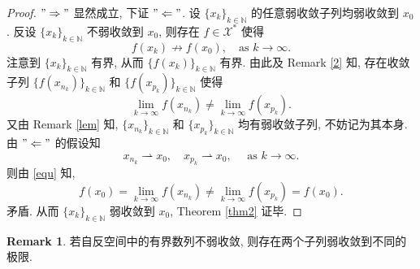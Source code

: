\documentclass[a4paper,11pt]{article}
\theoremstyle{definition}
\newtheorem{remark}[theorem]{Remark}
\begin{document}
\begin{proof}
    $ "\Rightarrow" $ 显然成立, 下证 $ "\Leftarrow" $. 
    设 $ \{x_k\}_{k \in \mathbb{N}} $ 的任意弱收敛子列均弱收敛到 $ x_0 $.
    反设 $ \{x_k\}_{k \in \mathbb{N}} $ 不弱收敛到 $ x_0 $, 
    则存在 $ f \in \mathcal{X}^* $ 使得
    $$
        f(x_k) \nrightarrow f(x_0), \quad \text{as } k \to \infty.
    $$
    注意到 $ \{x_k\}_{k \in \mathbb{N}} $ 有界, 从而 $ \{f(x_k)\}_{k \in \mathbb{N}} $ 有界. 
    由此及 Remark \ref{2} 知, 存在收敛子列 $ \{f(x_{n_k})\}_{k \in \mathbb{N}} $ 
    和 $ \{f(x_{p_k})\}_{k \in \mathbb{N}} $ 使得
    \begin{equation} \label{equ}
        \lim_{k \to \infty} f(x_{n_k}) \neq \lim_{k \to \infty} f(x_{p_k}).
    \end{equation}
    又由 Remark \ref{lem} 知, $ \{x_{n_k}\}_{k \in \mathbb{N}} $ 和 $ \{x_{p_k}\}_{k \in \mathbb{N}} $
    均有弱收敛子列, 不妨记为其本身. 由 $ "\Leftarrow" $ 的假设知
    $$
        x_{n_k} \rightharpoonup x_0, \quad 
        x_{p_k} \rightharpoonup x_0, \quad \text{ as } k \to \infty.
    $$
    则由 \eqref{equ} 知,
    $$
        f(x_0) = \lim_{k \to \infty} f(x_{n_k}) 
               \neq \lim_{k \to \infty} f(x_{p_k}) 
               = f(x_0).
    $$
    矛盾. 从而 $ \{x_k\}_{k \in \mathbb{N}} $ 弱收敛到 $ x_0 $, Theorem \ref{thm2} 证毕.
\end{proof}

\begin{remark}
    若自反空间中的有界数列不弱收敛, 则存在两个子列弱收敛到不同的极限.
\end{remark}
\end{document}

